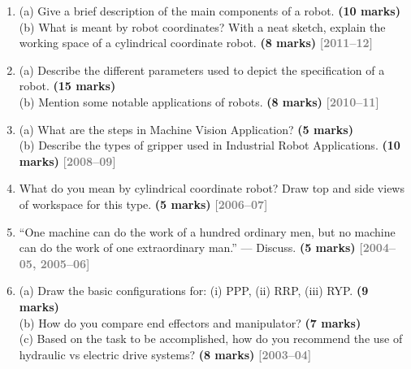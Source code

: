 \documentclass[12pt,a3paper]{article}
\newcommand{\yr}[1]{\hfill\textcolor{gray}{\small\textbf{[#1]}}}
\newcommand{\mk}[1]{\textcolor{orange!70!black}{\small\textbf{(#1 marks)}}}
\begin{document}
\begin{enumerate}
\item \label{qlabel:C1-Q11}
(a) Give a brief description of the main components of a robot. \mk{10}\\
(b) What is meant by robot coordinates? With a neat sketch, explain the working space of a cylindrical coordinate robot. \mk{8}
\yr{2011--12}




\item \label{qlabel:C1-Q10}
(a) Describe the different parameters used to depict the specification of a robot. \mk{15}\\
(b) Mention some notable applications of robots. \mk{8}
\yr{2010--11}




\item \label{qlabel:C1-Q12}
(a) What are the steps in Machine Vision Application? \mk{5}\\
(b) Describe the types of gripper used in Industrial Robot Applications. \mk{10}
\yr{2008--09}




\item \label{qlabel:C1-Q13}
What do you mean by cylindrical coordinate robot? Draw top and side views of workspace for this type. \mk{5}
\yr{2006--07}




\item \label{qlabel:C1-Q14}
``One machine can do the work of a hundred ordinary men, but no machine can do the work of one extraordinary man.'' --- Discuss. \mk{5}
\yr{2004--05, 2005--06}




\item \label{qlabel:C1-Q15}
(a) Draw the basic configurations for: (i) PPP, (ii) RRP, (iii) RYP. \mk{9}\\
(b) How do you compare end effectors and manipulator? \mk{7}\\
(c) Based on the task to be accomplished, how do you recommend the use of hydraulic vs electric drive systems? \mk{8}
\yr{2003--04}





\end{enumerate}
\end{document}
